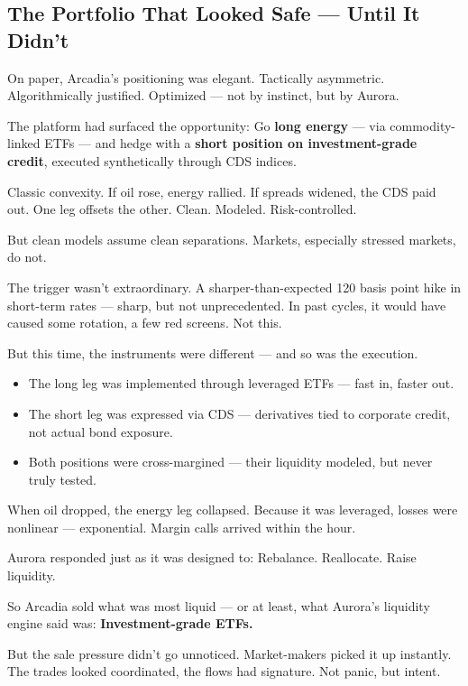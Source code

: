 \subsection{The Portfolio That Looked Safe — Until It Didn’t}

On paper, Arcadia’s positioning was elegant.  
Tactically asymmetric.  
Algorithmically justified.  
Optimized — not by instinct, but by Aurora.

The platform had surfaced the opportunity:  
Go \textbf{long energy} — via commodity-linked ETFs —  
and hedge with a \textbf{short position on investment-grade credit}, executed synthetically through CDS indices.

Classic convexity.  
If oil rose, energy rallied.  
If spreads widened, the CDS paid out.  
One leg offsets the other.  
Clean. Modeled. Risk-controlled.

But clean models assume clean separations.  
Markets, especially stressed markets, do not.

The trigger wasn’t extraordinary.  
A sharper-than-expected 120 basis point hike in short-term rates — sharp, but not unprecedented.  
In past cycles, it would have caused some rotation, a few red screens. Not this.

But this time, the instruments were different — and so was the execution.

\begin{itemize}
  \item The long leg was implemented through leveraged ETFs — fast in, faster out.
  \item The short leg was expressed via CDS — derivatives tied to corporate credit, not actual bond exposure.
  \item Both positions were cross-margined — their liquidity modeled, but never truly tested.
\end{itemize}

When oil dropped, the energy leg collapsed.  
Because it was leveraged, losses were nonlinear — exponential.  
Margin calls arrived within the hour.

Aurora responded just as it was designed to:  
Rebalance. Reallocate. Raise liquidity.

So Arcadia sold what was most liquid — or at least, what Aurora’s liquidity engine said was:  
\textbf{Investment-grade ETFs.}

But the sale pressure didn’t go unnoticed.  
Market-makers picked it up instantly.  
The trades looked coordinated, the flows had signature.  
Not panic, but intent.

